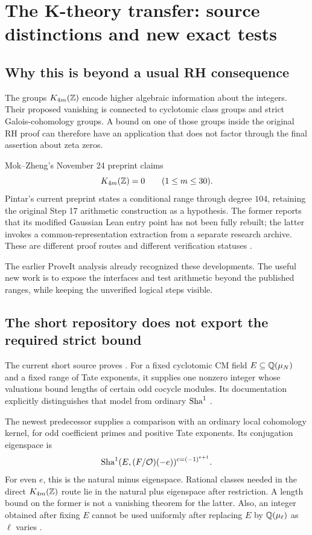 \section{The K-theory transfer: source distinctions and new exact tests}
\label{sec:ktheory}

\subsection{Why this is beyond a usual RH consequence}

The groups $K_{4m}(\mathbb Z)$ encode higher algebraic information about the
integers. Their proposed vanishing is connected to cyclotomic class groups
and strict Galois-cohomology groups. A bound on one of those groups inside
the original RH proof can therefore have an application that does not
factor through the final assertion about zeta zeros.

Mok--Zheng's November 24 preprint claims
\[
 K_{4m}(\mathbb Z)=0\qquad(1\le m\le30).
\]
Pintar's current preprint states a conditional range through degree $104$,
retaining the original Step 17 arithmetic construction as a hypothesis.
The former reports that its modified Gaussian Lean entry point has not
been fully rebuilt; the latter invokes a common-representation extraction
from a separate research archive. These are different proof routes and
different verification statuses \cite{mokzheng,pintar}.

The earlier ProveIt analysis already recognized these developments.
The useful new work is to expose the interfaces and test arithmetic
beyond the published ranges, while keeping the unverified logical
steps visible.

\subsection{The short repository does not export the required strict bound}

The current short source proves
. For a fixed cyclotomic CM field
$E\subseteq\mathbb Q(\mu_N)$ and a fixed range of Tate exponents, it supplies
one nonzero integer whose valuations bound lengths of certain odd
cocycle modules. Its documentation explicitly distinguishes that
model from ordinary $\mathop{\mathrm{Sha}}\nolimits^1$ \cite{oddsha}.

The newest predecessor supplies a comparison with an ordinary local
cohomology kernel, for odd coefficient primes and positive Tate
exponents. Its conjugation eigenspace is
\[
 \mathop{\mathrm{Sha}}\nolimits^1(E,(F/\mathcal O)(-e))^{c=(-1)^{e+1}}.
\]
For even $e$, this is the natural minus eigenspace. Rational classes
needed in the direct $K_{4m}(\mathbb Z)$ route lie in the natural plus
eigenspace after restriction. A length bound on the former is not a
vanishing theorem for the latter. Also, an integer obtained after
fixing $E$ cannot be used uniformly after replacing $E$ by
$\mathbb Q(\mu_\ell)$ as $\ell$ varies \cite{priorbeyond}.

